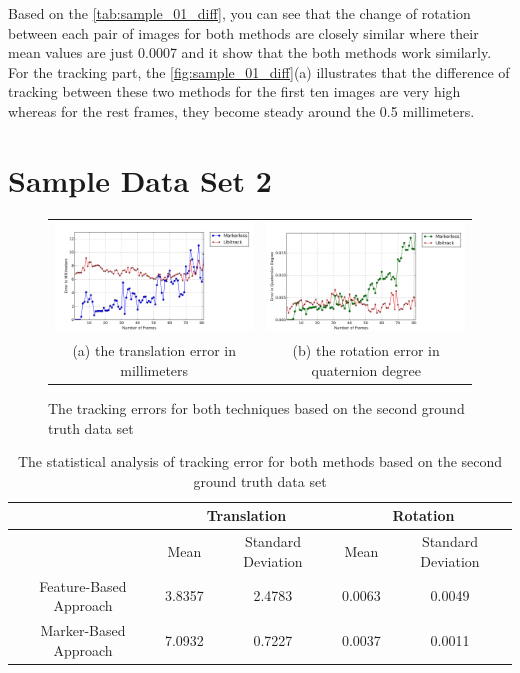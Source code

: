 Based on the \autoref{tab:sample_01_diff}, you can see that the change of rotation between each pair of images for both methods are closely similar where their mean values are just 0.0007 and it show that the both methods work similarly. For the tracking part, the \autoref{fig:sample_01_diff}(a) illustrates that the difference of tracking between these two methods for the first ten images are very high whereas for the rest frames, they become steady around the 0.5 millimeters.

\section{Sample Data Set 2} \label{sec:sample_2}
\begin{figure}[H]
\begin{tabular}{cc}
  \includegraphics[width=80mm]{figures/frame_400/graph_translation} &  \includegraphics[width=80mm]{figures/frame_400/graph_rotation} \\
(a) the translation error in millimeters & (b) the rotation error in quaternion degree \\[6pt]
\end{tabular}
\caption{The tracking errors for both techniques based on the second ground truth data set}\label{fig:sample_02}
\end{figure}

\begin{table}[H]
\centering
  \begin{tabular}{| c || c | c | c | c |}
      \hline
      & \multicolumn{2}{c|}{Translation} & \multicolumn{2}{c|}{Rotation} \\ \hline
       & Mean & Standard Deviation & Mean & Standard Deviation \\ \hline
      Feature-Based Approach & 3.8357 & 2.4783 & 0.0063 & 0.0049 \\ \hline
      Marker-Based Approach & 7.0932 & 0.7227 & 0.0037 & 0.0011 \\ \hline
  \end{tabular}
  \caption{The statistical analysis of tracking error for both methods based on the second ground truth data set} \label{tab:sample_02}
\end{table}

